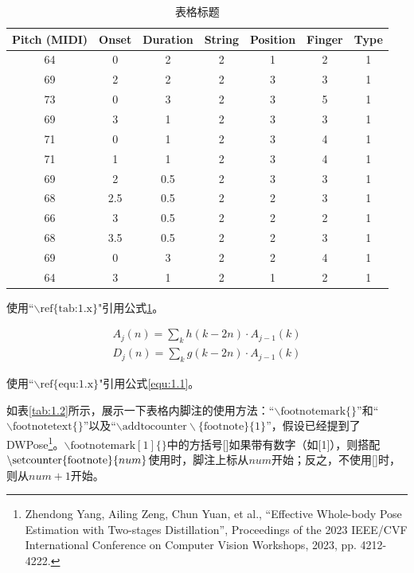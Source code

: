 \documentclass[a4paper,scheme=chinese,linespread=1.5]{ctexbook} %
\begin{document}
	\begin{table}[h]
		\centering
		\caption{表格标题}
		\vspace*{-1em}
		\begin{tabular}{ccccccc}
			\toprule[1.5pt]
			Pitch (MIDI) & Onset & Duration  & String & Position & Finger & Type \\ \midrule[0.75pt]
			64           & 0     & 2         & 2 	  & 1 		 & 2 	  & 1 \\
			69           & 2     & 2         & 2 	  & 3		 & 3 	  & 1 \\
			73           & 0     & 3         & 2 	  & 3 		 & 5 	  & 1 \\
			69           & 3     & 1         & 2 	  & 3 		 & 3 	  & 1 \\
			71           & 0     & 1         & 2 	  & 3 		 & 4 	  & 1 \\
			71           & 1     & 1         & 2 	  & 3 		 & 4 	  & 1 \\
			69           & 2     & 0.5       & 2 	  & 3 		 & 3 	  & 1 \\
			68           & 2.5   & 0.5       & 2 	  & 2 		 & 3 	  & 1 \\
			66           & 3     & 0.5       & 2 	  & 2 		 & 2 	  & 1 \\
			68           & 3.5   & 0.5       & 2 	  & 2 		 & 3 	  & 1 \\
			69           & 0     & 3         & 2 	  & 2 		 & 4 	  & 1 \\
			64           & 3     & 1         & 2 	  & 1 		 & 2 	  & 1 \\ 
			\bottomrule[1.5pt]
		\end{tabular}
		\label{tab:1.1}
	\end{table}
	
	使用“\textbf{$\backslash \text{ref\{tab:1.x\}}$}"引用公式\ref{tab:1.1}。
	
	\begin{align}
		A_j(n)= \sum_{k}^{}  h(k-2n) \cdot A_{j-1}(k) \\
		D_j(n)= \sum_{k}^{}  g(k-2n) \cdot A_{j-1}(k)
		\label{equ:1.1}
	\end{align}
	
	使用“\textbf{$\backslash \text{ref\{equ:1.x\}}$}"引用公式\ref{equ:1.1}。
	
	\newpage
	
	如表\ref{tab:1.2}所示，展示一下表格内脚注的使用方法：“$\backslash \text{footnotemark}\{\}$”和“$\backslash \text{footnotetext\{\}}$”以及“$\backslash \text{addtocounter} \backslash \text{\{footnote\}\{1\}}$”，假设已经提到了DWPose\footnote{Zhendong Yang, Ailing Zeng, Chun Yuan, et al., “Effective Whole-body Pose Estimation with Two-stages Distillation”, Proceedings of the 2023 IEEE/CVF International Conference on Computer Vision Workshops, 2023, pp. 4212-4222.}。$\backslash \text{footnotemark} [ 1 ]\{\}$中的方括号[]如果带有数字（如[1]），则搭配$\backslash \text{setcounter\{footnote\}\{}\mathnormal{num}\text{\}}$使用时，脚注上标从$num$开始；反之，不使用[]时，则从$num+1$开始。
	
\end{document}
